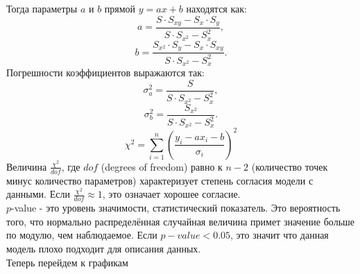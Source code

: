\documentclass[a4paper]{article}
\begin{document}
\begin{enumerate}
Тогда параметры $a$ и $b$ прямой $y = ax + b$ находятся как:
\begin{equation*}
	a = \frac{S \cdot S_{xy} - S_x \cdot S_y}{S \cdot S_{x^2} - S_x^2},
\end{equation*}
\begin{equation*}
	b = \frac{S_{x^2} \cdot S_{y} - S_x \cdot S_{xy}}{S \cdot S_{x^2} - S_x^2}.
\end{equation*}
Погрешности коэффициентов выражаются так:
\begin{equation*}
	\sigma_a^2 = \frac{S}{S \cdot S_{x^2} - S_x^2},
\end{equation*}
\begin{equation*}
	\sigma_b^2 = \frac{S_{x^2}}{S \cdot S_{x^2} - S_x^2}.
\end{equation*}
\begin{equation*}
	\chi^2 = \sum_{i=1}^{n} \left(\frac{y_i - ax_i-b}{\sigma_i}\right)^2
\end{equation*}
Величина $\frac{\chi^2}{dof}$, где $dof$ (degrees of freedom) равно к $n-2$ (количество точек минус количество параметров) характеризует степень согласия модели с данными. Если $\frac{\chi^2}{dof} \approx 1$, это означает хорошее согласие.\\
$p$-value - это уровень значимости, статистический показатель. Это вероятность того, что нормально распределённая случайная величина примет значение больше по модулю, чем наблюдаемое. Если $p-value < 0.05$, это значит что данная модель плохо подходит для описания данных.\\
Теперь перейдем к графикам
\clearpage
\begin{figure}[h!]

\end{figure}
\end{enumerate}
\end{document}
